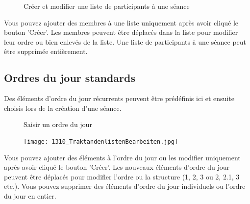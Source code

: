 \begin{figure}[H]
\end{figure}

\begin{figure}[H]
\vspace{-25pt}
\caption{Créer et modifier une liste de participants à une séance}
\end{figure}

Vous pouvez ajouter des membres à une liste uniquement après avoir cliqué le bouton 'Créer'. Les membres peuvent être déplacés dans la liste pour modifier leur ordre ou bien enlevés de la liste. Une liste de participants à une séance peut être supprimée entièrement.

\clearpage
\subsection{Ordres du jour standards}

Des éléments d'ordre du jour récurrents peuvent être prédéfinis ici et ensuite choisis lors de la création d'une séance.

\begin{figure}[H]
\caption{Saisir un ordre du jour}
\end{figure}

\begin{figure}
\vspace{-15pt}
\texttt{[image: 1310\_TraktandenlistenBearbeiten.jpg]}
\end{figure}

Vous pouvez ajouter des éléments à l'ordre du jour ou les modifier uniquement après avoir cliqué le bouton 'Créer'. Les nouveaux éléments d'ordre du jour peuvent être déplacés pour modifier l'ordre ou la structure (1, 2, 3 ou 2, 2.1, 3 etc.). Vous pouvez supprimer des éléments d'ordre du jour individuels ou l'ordre du jour en entier.
